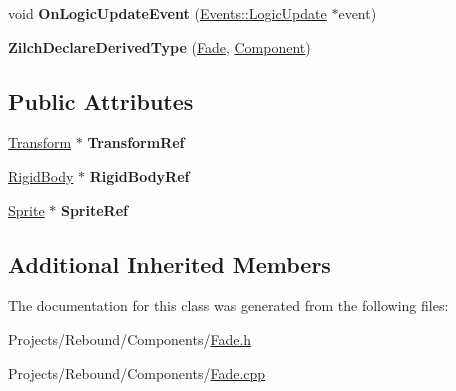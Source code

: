 \begin{DoxyCompactItemize}
\item 
\hypertarget{classDCEngine_1_1Components_1_1Fade_a938bbe51557c34268f2e950bd8e60ba1}{void {\bfseries On\-Logic\-Update\-Event} (\hyperlink{classDCEngine_1_1Events_1_1LogicUpdate}{Events\-::\-Logic\-Update} $\ast$event)}\label{classDCEngine_1_1Components_1_1Fade_a938bbe51557c34268f2e950bd8e60ba1}

\item 
\hypertarget{classDCEngine_1_1Components_1_1Fade_ae297db589d7fc6201d3db78f2b71e6ee}{{\bfseries Zilch\-Declare\-Derived\-Type} (\hyperlink{classDCEngine_1_1Components_1_1Fade}{Fade}, \hyperlink{classDCEngine_1_1Component}{Component})}\label{classDCEngine_1_1Components_1_1Fade_ae297db589d7fc6201d3db78f2b71e6ee}

\end{DoxyCompactItemize}
\subsection*{Public Attributes}
\begin{DoxyCompactItemize}
\item 
\hypertarget{classDCEngine_1_1Components_1_1Fade_add778625b511da0ba72b8f808d4426d4}{\hyperlink{classDCEngine_1_1Components_1_1Transform}{Transform} $\ast$ {\bfseries Transform\-Ref}}\label{classDCEngine_1_1Components_1_1Fade_add778625b511da0ba72b8f808d4426d4}

\item 
\hypertarget{classDCEngine_1_1Components_1_1Fade_a3912d344e68282dec9a35b629d8d8494}{\hyperlink{classDCEngine_1_1Components_1_1RigidBody}{Rigid\-Body} $\ast$ {\bfseries Rigid\-Body\-Ref}}\label{classDCEngine_1_1Components_1_1Fade_a3912d344e68282dec9a35b629d8d8494}

\item 
\hypertarget{classDCEngine_1_1Components_1_1Fade_a5c32e268303d9275f797101def14e95e}{\hyperlink{classDCEngine_1_1Components_1_1Sprite}{Sprite} $\ast$ {\bfseries Sprite\-Ref}}\label{classDCEngine_1_1Components_1_1Fade_a5c32e268303d9275f797101def14e95e}

\end{DoxyCompactItemize}
\subsection*{Additional Inherited Members}


The documentation for this class was generated from the following files\-:\begin{DoxyCompactItemize}
\item 
Projects/\-Rebound/\-Components/\hyperlink{Fade_8h}{Fade.\-h}\item 
Projects/\-Rebound/\-Components/\hyperlink{Fade_8cpp}{Fade.\-cpp}\end{DoxyCompactItemize}
